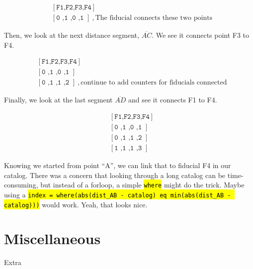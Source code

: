 \documentclass[10pt]{scrartcl}
\begin{document}
\begin{align}
  &[\texttt{F1,F2,F3,F4}]\\
  &[\texttt{0 ,1 ,0 ,1 }]~,\textrm{The fiducial connects these two points}
\end{align}

Then, we look at the next distance segment, $\overline{AC}$. We see it connects point F3 to F4.

\begin{align}
  &[\texttt{F1,F2,F3,F4}]\\
  &[\texttt{0 ,1 ,0 ,1 }]\\
  &[\texttt{0 ,1 ,1 ,2 }]~,\textrm{continue to add counters for fiducials connected}
\end{align}

Finally, we look at the last segment $\overline{AD}$ and see it connects F1 to F4.

\begin{align}
  &[\texttt{F1,F2,F3,F4}]\\
  &[\texttt{0 ,1 ,0 ,1 }]\\
  &[\texttt{0 ,1 ,1 ,2 }]\\
  &[\texttt{1 ,1 ,1 ,3 }]
\end{align}


Knowing we started from point ``A'', we can link that to fiducial F4 in our catalog. There was a concern that looking through a long catalog can be time-consuming, but instead of a forloop, a simple \hl{\texttt{where}} might do the trick. Maybe using a \hl{\texttt{index = where(abs(dist\_AB - catalog) eq min(abs(dist\_AB - catalog)))}} would work. Yeah, that looks nice.



\section{Miscellaneous} %
\label{sec:miscellaneous}
Extra
\end{document}
